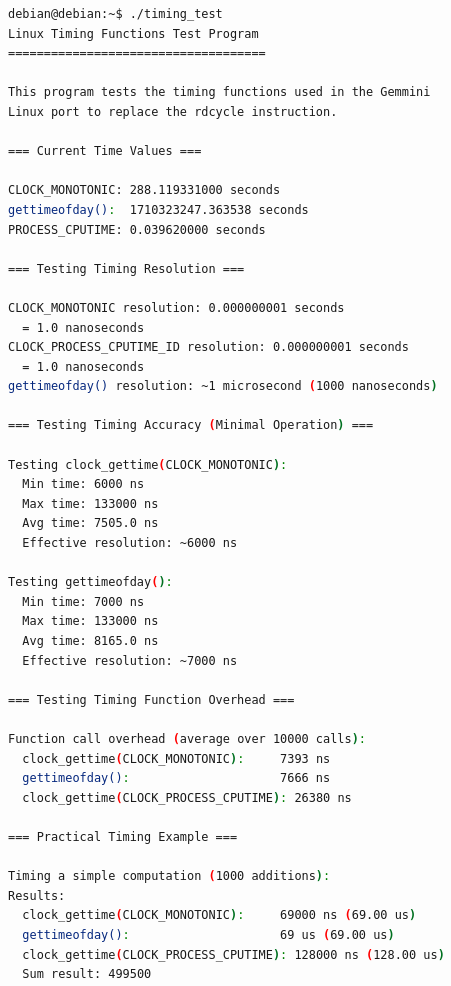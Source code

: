 \begin{lstlisting}[language=bash, caption={Output of Timing Test}, label={lst:timing_test_output}, captionpos=b]
debian@debian:~$ ./timing_test
Linux Timing Functions Test Program
====================================

This program tests the timing functions used in the Gemmini
Linux port to replace the rdcycle instruction.

=== Current Time Values ===

CLOCK_MONOTONIC: 288.119331000 seconds
gettimeofday():  1710323247.363538 seconds
PROCESS_CPUTIME: 0.039620000 seconds

=== Testing Timing Resolution ===

CLOCK_MONOTONIC resolution: 0.000000001 seconds
  = 1.0 nanoseconds
CLOCK_PROCESS_CPUTIME_ID resolution: 0.000000001 seconds
  = 1.0 nanoseconds
gettimeofday() resolution: ~1 microsecond (1000 nanoseconds)

=== Testing Timing Accuracy (Minimal Operation) ===

Testing clock_gettime(CLOCK_MONOTONIC):
  Min time: 6000 ns
  Max time: 133000 ns
  Avg time: 7505.0 ns
  Effective resolution: ~6000 ns

Testing gettimeofday():
  Min time: 7000 ns
  Max time: 133000 ns
  Avg time: 8165.0 ns
  Effective resolution: ~7000 ns

=== Testing Timing Function Overhead ===

Function call overhead (average over 10000 calls):
  clock_gettime(CLOCK_MONOTONIC):     7393 ns
  gettimeofday():                     7666 ns
  clock_gettime(CLOCK_PROCESS_CPUTIME): 26380 ns

=== Practical Timing Example ===

Timing a simple computation (1000 additions):
Results:
  clock_gettime(CLOCK_MONOTONIC):     69000 ns (69.00 us)
  gettimeofday():                     69 us (69.00 us)
  clock_gettime(CLOCK_PROCESS_CPUTIME): 128000 ns (128.00 us)
  Sum result: 499500
\end{lstlisting}
